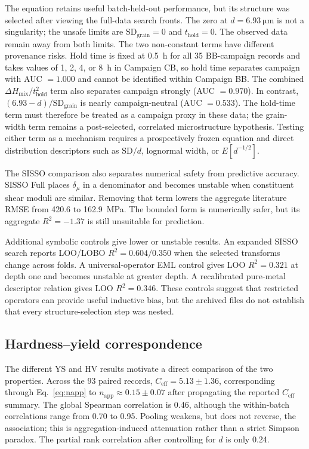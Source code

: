 \documentclass[5p,times,twocolumn]{elsarticle}
\begin{document}
The equation retains useful batch-held-out performance, but its structure was selected after viewing the full-data search fronts. The zero at $d=\SI{6.93}{\micro\meter}$ is not a singularity; the unsafe limits are $\mathrm{SD}_{\mathrm{grain}}=0$ and $t_{\mathrm{hold}}=0$. The observed data remain away from both limits. The two non-constant terms have different provenance risks. Hold time is fixed at 0.5~h for all 35 BB-campaign records and takes values of 1, 2, 4, or 8~h in Campaign CB, so hold time separates campaign with AUC $=1.000$ and cannot be identified within Campaign BB. The combined $\Delta H_{\mathrm{mix}}/t_{\mathrm{hold}}^2$ term also separates campaign strongly (AUC $=0.970$). In contrast, $(6.93-d)/\mathrm{SD}_{\mathrm{grain}}$ is nearly campaign-neutral (AUC $=0.533$). The hold-time term must therefore be treated as a campaign proxy in these data; the grain-width term remains a post-selected, correlated microstructure hypothesis. Testing either term as a mechanism requires a prospectively frozen equation and direct distribution descriptors such as $\mathrm{SD}/d$, lognormal width, or $E[d^{-1/2}]$.

The SISSO comparison also separates numerical safety from predictive accuracy. SISSO Full places $\delta_\mu$ in a denominator and becomes unstable when constituent shear moduli are similar. Removing that term lowers the aggregate literature RMSE from 420.6 to \SI{162.9}{MPa}. The bounded form is numerically safer, but its aggregate $R^2=-1.37$ is still unsuitable for prediction.

Additional symbolic controls give lower or unstable results. An expanded SISSO search reports LOO/LOBO $R^2=0.604/0.350$ when the selected transforms change across folds. A universal-operator EML control gives LOO $R^2=0.321$ at depth one and becomes unstable at greater depth. A recalibrated pure-metal descriptor relation gives LOO $R^2=0.346$. These controls suggest that restricted operators can provide useful inductive bias, but the archived files do not establish that every structure-selection step was nested.

\subsection{Hardness--yield correspondence}

The different YS and HV results motivate a direct comparison of the two properties. Across the 93 paired records, $C_{\mathrm{eff}}=5.13\pm1.36$, corresponding through Eq.~\eqref{eq:napp} to $n_{\mathrm{app}}\approx0.15\pm0.07$ after propagating the reported $C_{\mathrm{eff}}$ summary. The global Spearman correlation is 0.46, although the within-batch correlations range from 0.70 to 0.95. Pooling weakens, but does not reverse, the association; this is aggregation-induced attenuation rather than a strict Simpson paradox. The partial rank correlation after controlling for $d$ is only 0.24.
\end{document}
